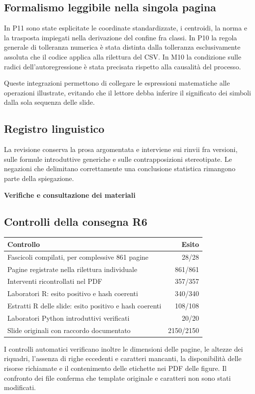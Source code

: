 \documentclass[11pt,a4paper]{article}
\newcommand{\titolo}[1]{{\color{Navy}\LARGE\bfseries #1\par}\vspace{4pt}{\color{Teal}\hrule height 1.4pt}\vspace{12pt}}
\begin{document}
\subsection*{Formalismo leggibile nella singola pagina}
In P11 sono state esplicitate le coordinate standardizzate, i centroidi, la norma e la trasposta impiegati nella derivazione del confine fra classi. In P10 la regola generale di tolleranza numerica è stata distinta dalla tolleranza esclusivamente assoluta che il codice applica alla rilettura del CSV. In M10 la condizione sulle radici dell’autoregressione è stata precisata rispetto alla causalità del processo.

Queste integrazioni permettono di collegare le espressioni matematiche alle operazioni illustrate, evitando che il lettore debba inferire il significato dei simboli dalla sola sequenza delle slide.

\subsection*{Registro linguistico}
La revisione conserva la prosa argomentata e interviene sui rinvii fra versioni, sulle formule introduttive generiche e sulle contrapposizioni stereotipate. Le negazioni che delimitano correttamente una conclusione statistica rimangono parte della spiegazione.

\newpage
\titolo{Verifiche e consultazione dei materiali}
\subsection*{Controlli della consegna R6}
\begin{tabular}{p{12.4cm}r}\toprule
Controllo & Esito\\\midrule
Fascicoli compilati, per complessive 861 pagine & 28/28\\
Pagine registrate nella rilettura individuale & 861/861\\
Interventi ricontrollati nel PDF & 357/357\\
Laboratori R: esito positivo e hash coerenti & 340/340\\
Estratti R delle slide: esito positivo e hash coerenti & 108/108\\
Laboratori Python introduttivi verificati & 20/20\\
Slide originali con raccordo documentato & 2150/2150\\\bottomrule
\end{tabular}

I controlli automatici verificano inoltre le dimensioni delle pagine, le altezze dei riquadri, l’assenza di righe eccedenti e caratteri mancanti, la disponibilità delle risorse richiamate e il contenimento delle etichette nei PDF delle figure. Il confronto dei file conferma che template originale e caratteri non sono stati modificati.
\end{document}
